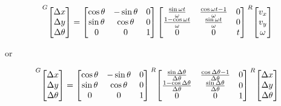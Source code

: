 \begin{theorem}
  \begin{equation}
    \prescript{G}{}{\begin{bmatrix}
      \Delta x \\
      \Delta y \\
      \Delta \theta
    \end{bmatrix}} =
    \begin{bmatrix}
      \cos\theta & -\sin\theta & 0 \\
      \sin\theta &  \cos\theta & 0 \\
               0 &           0 & 1
    \end{bmatrix}
    \begin{bmatrix}
      \frac{\sin\omega t}{\omega} & \frac{\cos\omega t - 1}{\omega} & 0 \\
      \frac{1 - \cos\omega t}{\omega} & \frac{\sin\omega t}{\omega} & 0 \\
      0 & 0 & t
    \end{bmatrix}
    \prescript{R}{}{\begin{bmatrix}
      v_x \\
      v_y \\
      \omega
    \end{bmatrix}}
    \label{eq:nonlinear_pose_estimator}
  \end{equation}

  or

  \begin{equation}
    \prescript{G}{}{\begin{bmatrix}
      \Delta x \\
      \Delta y \\
      \Delta \theta
    \end{bmatrix}} =
    \begin{bmatrix}
      \cos\theta & -\sin\theta & 0 \\
      \sin\theta &  \cos\theta & 0 \\
               0 &           0 & 1
    \end{bmatrix}
    \prescript{R}{}{\begin{bmatrix}
      \frac{\sin\Delta\theta}{\Delta\theta} &
        \frac{\cos\Delta\theta - 1}{\Delta\theta} & 0 \\
      \frac{1 - \cos\Delta\theta}{\Delta\theta} &
        \frac{\sin\Delta\theta}{\Delta\theta} & 0 \\
      0 & 0 & 1
    \end{bmatrix}}
    \prescript{R}{}{\begin{bmatrix}
      \Delta x \\
      \Delta y \\
      \Delta\theta
    \end{bmatrix}}
  \end{equation}


\end{theorem}
